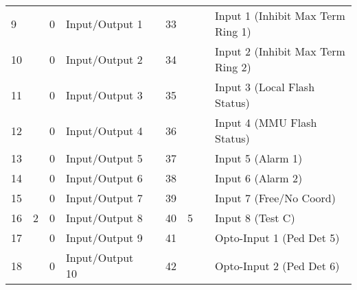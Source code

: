 \documentclass[]{article}
\begin{document}
\begin{landscape}
\begin{table}[]
\begin{tabular}{lllllllll}
			9            &                     & 0              & \cellcolor[HTML]{EFEFEF}Input/Output 1  &                    & 33           &                     &                & Input 1 (Inhibit Max Term Ring 1)               \\
			10           &                     & 0              & \cellcolor[HTML]{EFEFEF}Input/Output 2  &                    & 34           &                     &                & Input 2 (Inhibit Max Term Ring 2)               \\
			11           &                     & 0              & \cellcolor[HTML]{EFEFEF}Input/Output 3  &                    & 35           &                     &                & Input 3 (Local Flash Status)                    \\
			12           &                     & 0              & \cellcolor[HTML]{EFEFEF}Input/Output 4  &                    & 36           &                     &                & Input 4 (MMU Flash Status)                      \\
			13           &                     & 0              & \cellcolor[HTML]{EFEFEF}Input/Output 5  &                    & 37           &                     &                & Input 5 (Alarm 1)                               \\
			14           &                     & 0              & \cellcolor[HTML]{EFEFEF}Input/Output 6  &                    & 38           &                     &                & Input 6 (Alarm 2)                               \\
			15           &                     & 0              & \cellcolor[HTML]{EFEFEF}Input/Output 7  &                    & 39           &                     &                & Input 7 (Free/No Coord)                         \\
			16           & \multirow{-8}{*}{2} & 0              & \cellcolor[HTML]{EFEFEF}Input/Output 8  &                    & 40           & \multirow{-8}{*}{5} &                & Input 8 (Test C)                                \\ \cline{1-4} \cline{6-9} 
			17           &                     & 0              & \cellcolor[HTML]{EFEFEF}Input/Output 9  &                    & 41           &                     &                & Opto-Input 1 (Ped Det 5)                        \\
			18           &                     & 0              & \cellcolor[HTML]{EFEFEF}Input/Output 10 &                    & 42           &                     &                & Opto-Input 2 (Ped Det 6)                        \\

\end{tabular}
\end{table}
\end{landscape}
\end{document}
